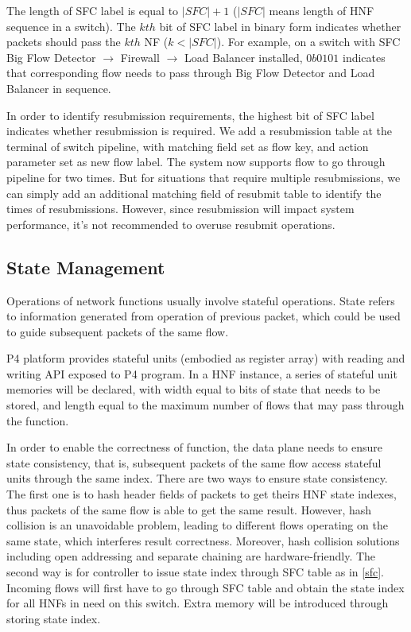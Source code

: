 \documentclass[10pt, conference, letterpaper]{IEEEtran}
\begin{document}
The length of SFC label is equal to $|SFC|+1$ ($|SFC|$ means length of HNF sequence in a switch). The $kth$ bit of SFC label in binary form indicates whether packets should pass the $kth$ NF ($k <|SFC|$). For example, on a switch with SFC Big Flow Detector $\rightarrow$ Firewall $\rightarrow$ Load Balancer installed, $0b0101$ indicates that corresponding flow needs to pass through Big Flow Detector and Load Balancer in sequence. 

In order to identify resubmission requirements, the highest bit of SFC label indicates whether resubmission is required. We add a resubmission table at the terminal of switch pipeline, with matching field set as flow key, and action parameter set as new flow label. 
The system now supports flow to go through pipeline for two times. But for situations that require multiple resubmissions, we can simply add an additional matching field of resubmit table to identify the times of resubmissions. However, since resubmission will impact system performance, it's not recommended to overuse resubmit operations. 


\subsection{State Management}
Operations of network functions usually involve stateful operations. State refers to information generated from operation of previous packet, which could be used to guide subsequent packets of the same flow. 

P4 platform provides stateful units (embodied as register array) with reading and writing API exposed to P4 program.
In a HNF instance, a series of stateful unit memories will be declared, with width equal to bits of state that needs to be stored, and length equal to the maximum number of flows that may pass through the function.

In order to enable the correctness of function, the data plane needs to ensure state consistency, that is, subsequent packets of the same flow access stateful units through the same index. There are two ways to ensure state consistency. 
The first one is to hash header fields of packets to get theirs HNF state indexes, thus packets of the same flow is able to get the same result.
However, hash collision is an unavoidable problem, leading to different flows operating on the same state, which interferes result correctness. Moreover, hash collision solutions including open addressing and separate chaining are hardware-friendly. 
The second way is for controller to issue state index through SFC table as in \ref{sfc}. Incoming flows will first have to go through SFC table and obtain the state index for all HNFs in need on this switch. Extra memory will be introduced through storing state index.
\end{document}
